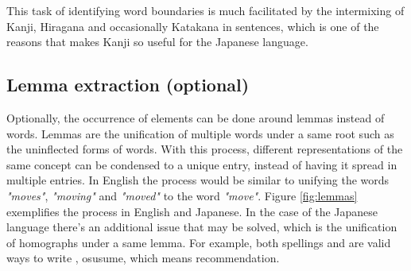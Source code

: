 This task of identifying word boundaries is much facilitated by the intermixing of Kanji, Hiragana and occasionally Katakana in sentences, which is one of the reasons that makes Kanji so useful for the Japanese language.

\subsection{Lemma extraction (optional)}

Optionally, the occurrence of elements can be done around lemmas instead of words. Lemmas are the unification of multiple words under a same root such as the uninflected forms of words. With this process, different representations of the same concept can be condensed to a unique entry, instead of having it spread in multiple entries. In English the process would be similar to unifying the words \textit{"moves"}, \textit{"moving"} and \textit{"moved"} to the word \textit{"move"}. Figure \ref{fig:lemmas} exemplifies the process in English and Japanese. In the case of the Japanese language there's an additional issue that may be solved, which is the unification of homographs under a same lemma. For example, both spellings  and  are valid ways to write , osusume, which means recommendation.


